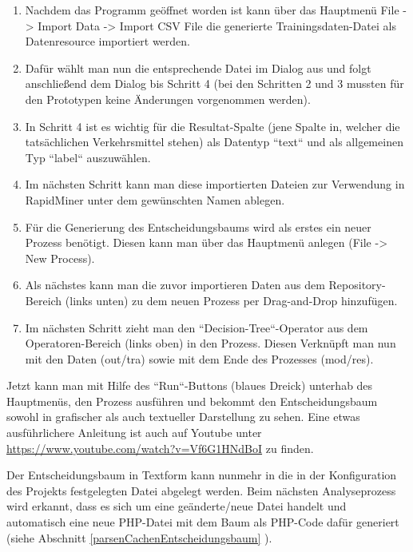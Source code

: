 \begin{enumerate}
\item Nachdem das Programm geöffnet worden ist kann über das Hauptmenü File -> Import Data -> Import CSV File die generierte Trainingsdaten-Datei als Datenresource importiert werden. 
\item Dafür wählt man nun die entsprechende Datei im Dialog aus und folgt anschließend dem Dialog bis Schritt 4 (bei den Schritten 2 und 3 mussten für den Prototypen keine Änderungen vorgenommen werden). 
\item In Schritt 4 ist es wichtig für die Resultat-Spalte (jene Spalte in, welcher die tatsächlichen Verkehrsmittel stehen) als Datentyp ``text`` und als allgemeinen Typ ``label`` auszuwählen. 
\item Im nächsten Schritt kann man diese importierten Dateien zur Verwendung in RapidMiner unter dem gewünschten Namen ablegen.
\item Für die Generierung des Entscheidungsbaums wird als erstes ein neuer Prozess benötigt. Diesen kann man über das Hauptmenü anlegen (File -> New Process).
\item Als nächstes kann man die zuvor importieren Daten aus dem Repository-Bereich (links unten) zu dem neuen Prozess per Drag-and-Drop hinzufügen. 
\item Im nächsten Schritt zieht man den ``Decision-Tree``-Operator aus dem Operatoren-Bereich (links oben) in den Prozess. Diesen Verknüpft man nun mit den Daten (out/tra) sowie mit dem Ende des Prozesses (mod/res).
\end{enumerate}

Jetzt kann man mit Hilfe des ``Run``-Buttons (blaues Dreick) unterhab des Hauptmenüs, den Prozess ausführen und bekommt den Entscheidungsbaum sowohl in grafischer als auch textueller Darstellung zu sehen. Eine etwas ausführlichere Anleitung ist auch auf Youtube unter \url{https://www.youtube.com/watch?v=Vf6G1HNdBoI} zu finden.

Der Entscheidungsbaum in Textform kann nunmehr in die in der Konfiguration des Projekts festgelegten Datei abgelegt werden. Beim nächsten Analyseprozess wird erkannt, dass es sich um eine geänderte/neue Datei handelt und automatisch eine neue PHP-Datei mit dem Baum als PHP-Code dafür generiert (siehe Abschnitt \ref{parsenCachenEntscheidungsbaum} ).